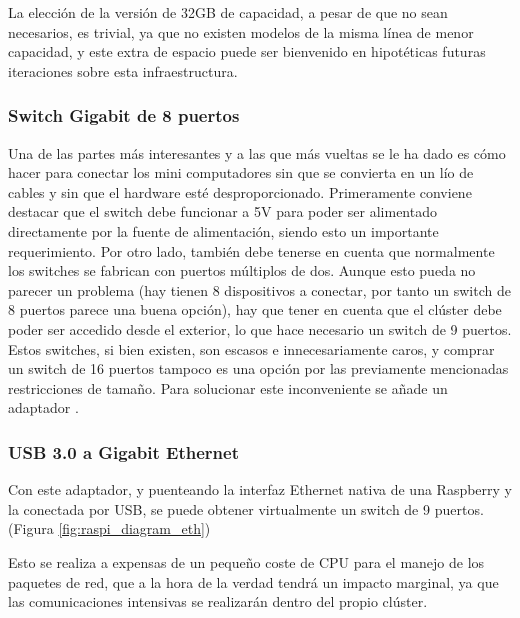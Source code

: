 La elección de la versión de 32GB de capacidad, a pesar de que no sean necesarios, es trivial, ya que no existen modelos de la misma línea de menor capacidad, y este extra de espacio puede ser bienvenido en hipotéticas futuras iteraciones sobre esta infraestructura.


\subsubsection{Switch Gigabit de 8 puertos}
Una de las partes más interesantes y a las que más vueltas se le ha dado es cómo hacer para conectar los mini computadores sin que se convierta en un lío de cables y sin que el hardware esté desproporcionado. Primeramente conviene destacar que el switch debe funcionar a 5V para poder ser alimentado directamente por la fuente de alimentación, siendo esto un importante requerimiento.
Por otro lado, también debe tenerse en cuenta que normalmente los switches se fabrican con puertos múltiplos de dos. Aunque esto pueda no parecer un problema (hay tienen 8 dispositivos a conectar, por tanto un switch de 8 puertos parece una buena opción), hay que tener en cuenta que el clúster debe poder ser accedido desde el exterior, lo que hace necesario un switch de 9 puertos. Estos switches, si bien existen, son escasos e innecesariamente caros, y comprar un switch de 16 puertos tampoco es una opción por las previamente mencionadas restricciones de tamaño. Para solucionar este inconveniente se añade un adaptador .

\subsubsection{USB 3.0 a Gigabit Ethernet}
\label{sssec:usb30_gbe}
Con este adaptador, y puenteando la interfaz Ethernet nativa de una Raspberry y la conectada por USB, se puede obtener virtualmente un switch de 9 puertos. (Figura \ref{fig:raspi_diagram_eth})

Esto se realiza a expensas de un pequeño coste de CPU para el manejo de los paquetes de red, que a la hora de la verdad tendrá un impacto marginal, ya que las comunicaciones intensivas se realizarán dentro del propio clúster.

